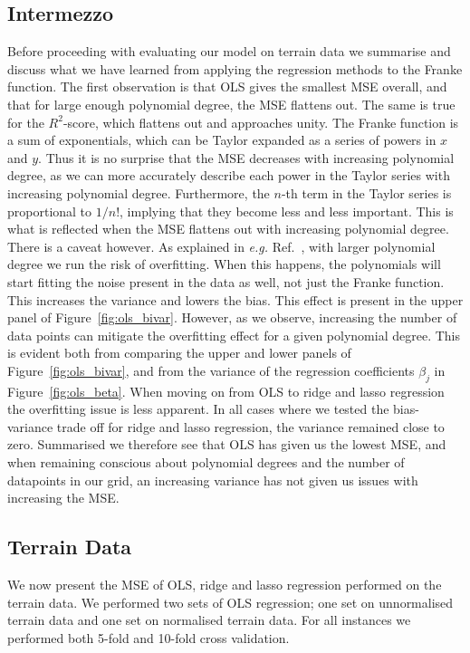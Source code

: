 \documentclass[a4paper, 
amsfonts, 
amssymb, 
amsmath, 
reprint, 
showkeys, 
nofootinbib, 
twoside]{revtex4-2}
\begin{document}
\subsection{Intermezzo}
Before proceeding with evaluating our model on terrain data we summarise and discuss what we have learned from applying the regression methods to the Franke function. 
The first observation is that OLS gives the smallest MSE overall, and that for large enough polynomial degree, the MSE flattens out. The same is true for the $R^2$-score, which flattens out and approaches unity. The Franke function is a sum of exponentials, which can be Taylor expanded as a series of powers in $x$ and $y$. Thus it is no surprise that the MSE decreases with increasing polynomial degree, as we can more accurately describe each power in the Taylor series with increasing polynomial degree. Furthermore, the $n$-th term in the Taylor series is proportional to $1/n!$, implying that they become less and less important. This is what is reflected when the MSE flattens out with increasing polynomial degree. There is a caveat however. As explained in \textit{e.g.} Ref.~\cite{Hastie}, with larger polynomial degree we run the risk of overfitting. When this happens, the polynomials will start fitting the noise present in the data as well, not just the Franke function. This increases the variance and lowers the bias. This effect is present in the upper panel of Figure~\ref{fig:ols_bivar}. However, as we observe, increasing the number of data points can mitigate the overfitting effect for a given polynomial degree. This is evident both from comparing the upper and lower panels of Figure~\ref{fig:ols_bivar}, and from the variance of the regression coefficients $\beta_j$ in Figure~\ref{fig:ols_beta}. When moving on from OLS to ridge and lasso regression the overfitting issue is less apparent. In all cases where we tested the bias-variance trade off for ridge and lasso regression, the variance remained close to zero. Summarised we therefore see that OLS has given us the lowest MSE, and when remaining conscious about polynomial degrees and the number of datapoints in our grid, an increasing variance has not given us issues with increasing the MSE.

\subsection{Terrain Data}

We now present the MSE of OLS, ridge and lasso regression performed on the terrain data. We performed two sets of OLS regression; one set on unnormalised terrain data and one set on normalised terrain data. For all instances we performed both 5-fold and 10-fold cross validation. 
\end{document}
